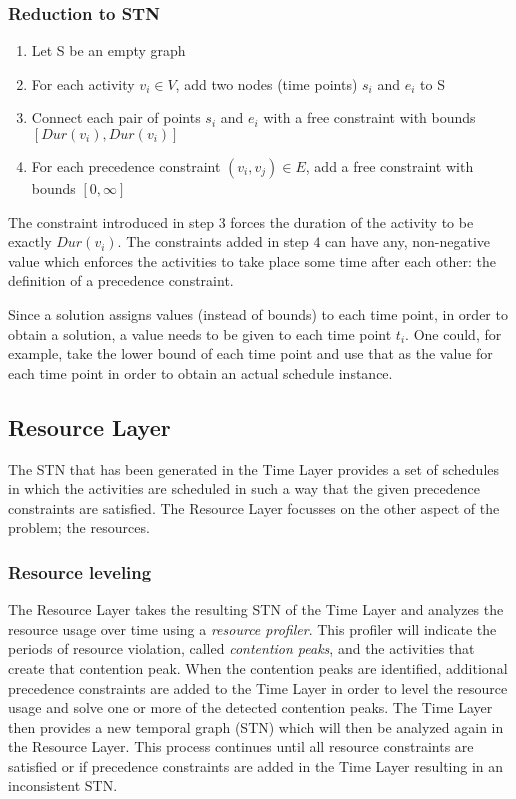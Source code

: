 \documentclass{article}
\newcommand{\dur}[1]{\textit{Dur}(#1)} %
\begin{document}
\subsubsection{Reduction to STN}
\begin{enumerate}
\item Let S be an empty graph
\item For each activity $v_i \in V$, add two nodes (time points) $s_i$ and $e_i$ to S
\item Connect each pair of points $s_i$ and $e_i$ with a free constraint with bounds $[\dur{v_i}, \dur{v_i}]$
\item For each precedence constraint $(v_i, v_j) \in E$, add a free constraint with bounds $[0, \infty]$
\end{enumerate}

The constraint introduced in step $3$ forces the duration of the activity to be exactly $\dur{v_i}$. The constraints added in step $4$ can have any, non-negative value which enforces the activities to take place some time after each other: the definition of a precedence constraint.

Since a solution assigns values (instead of bounds) to each time point, in order to obtain a solution, a value needs to be given to each time point $t_i$.
One could, for example, take the lower bound of each time point and use that as the value for each time point in order to obtain an actual schedule instance.

\subsection{Resource Layer}
The STN that has been generated in the Time Layer provides a set of schedules in which the activities are scheduled in such a way that the given precedence constraints are satisfied. The Resource Layer focusses on the other aspect of the problem; the resources. 

\subsubsection{Resource leveling}
The Resource Layer takes the resulting STN of the Time Layer and analyzes the resource usage over time using a \emph{resource profiler}. This profiler will indicate the periods of resource violation, called \emph{contention peaks}, and the activities that create that contention peak. When the contention peaks are identified, additional precedence constraints are added to the Time Layer in order to level the resource usage and solve one or more of the detected contention peaks. The Time Layer then provides a new temporal graph (STN) which will then be analyzed again in the Resource Layer. This process continues until all resource constraints are satisfied or if precedence constraints are added in the Time Layer resulting in an inconsistent STN. 
\end{document}
